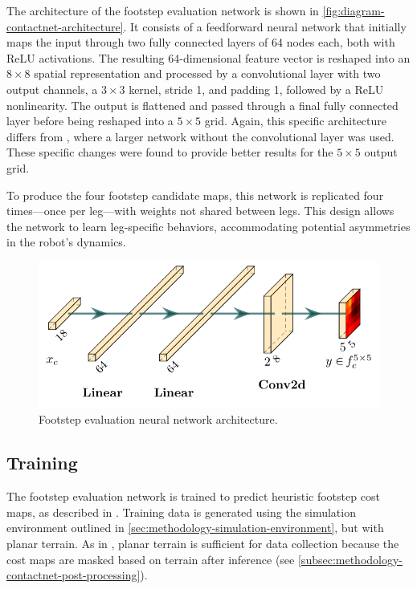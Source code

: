 The architecture of the footstep evaluation network is shown in
\autoref{fig:diagram-contactnet-architecture}. It consists of a
feedforward neural network that initially maps the input through two
fully connected layers of 64 nodes each, both with ReLU activations.
The resulting 64-dimensional feature vector is reshaped into an $8
\times 8$ spatial representation and processed by a convolutional
layer with two output channels, a $3 \times 3$ kernel, stride 1, and
padding 1, followed by a ReLU nonlinearity. The output is flattened
and passed through a final fully connected layer before being
reshaped into a $5 \times 5$ grid. Again, this specific architecture
differs from \cite{bratta_contactnet_2024}, where a larger network
without the convolutional layer was used. These specific changes were
found to provide better results for the $5 \times 5$ output grid.

To produce the four footstep candidate maps, this network is
replicated four times—once per leg—with weights not shared between
legs. This design allows the network to learn leg-specific behaviors,
accommodating potential asymmetries in the robot’s dynamics.

\begin{figure}[H]
  \centering
  \includegraphics[width=0.5\linewidth]{images/diagrams/contact-network-architecture.png}
  \caption{Footstep evaluation neural network architecture.}
  \label{fig:diagram-contactnet-architecture}
\end{figure}

\subsection{Training}
\label{subsec:methodology-contactnet-training}

The footstep evaluation network is trained to predict heuristic
footstep cost maps, as described in \cite{bratta_contactnet_2024}.
Training data is generated using the simulation environment outlined
in \autoref{sec:methodology-simulation-environment}, but with planar
terrain. As in \cite{bratta_contactnet_2024}, planar terrain is
sufficient for data collection because the cost maps are masked based
on terrain after inference (see
\autoref{subsec:methodology-contactnet-post-processing}).


